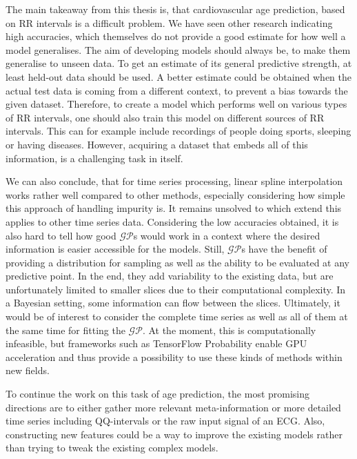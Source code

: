 \documentclass[11pt]{scrartcl}
\begin{document}
The main takeaway from this thesis is, that cardiovascular age prediction, based on RR intervals is a difficult problem. We have seen other research indicating high accuracies, which themselves do not provide a good estimate for how well a model generalises. The aim of developing models should always be, to make them generalise to unseen data. To get an estimate of its general predictive strength, at least held-out data should be used. A better estimate could be obtained when the actual test data is coming from a different context, to prevent a bias towards the given dataset. Therefore, to create a model which performs well on various types of RR intervals, one should also train this model on different sources of RR intervals. This can for example include recordings of people doing sports, sleeping or having diseases. However, acquiring a dataset that embeds all of this information, is a challenging task in itself.

We can also conclude, that for time series processing, linear spline interpolation works rather well compared to other methods, especially considering how simple this approach of handling impurity is. It remains unsolved to which extend this applies to other time series data. Considering the low accuracies obtained, it is also hard to tell how good $\mathcal{GP}$s would work in a context where the desired information is easier accessible for the models. Still, $\mathcal{GP}$s have the benefit of providing a distribution for sampling as well as the ability to be evaluated at any predictive point. In the end, they add variability to the existing data, but are unfortunately limited to smaller slices due to their computational complexity. In a Bayesian setting, some information can flow between the slices. Ultimately, it would be of interest to consider the complete time series as well as all of them at the same time for fitting the $\mathcal{GP}$. At the moment, this is computationally infeasible, but frameworks such as TensorFlow Probability enable GPU acceleration and thus provide a possibility to use these kinds of methods within new fields.

To continue the work on this task of age prediction, the most promising directions are to either gather more relevant meta-information or more detailed time series including QQ-intervals or the raw input signal of an ECG. Also, constructing new features could be a way to improve the existing models rather than trying to tweak the existing complex models.

\clearpage
\end{document}
